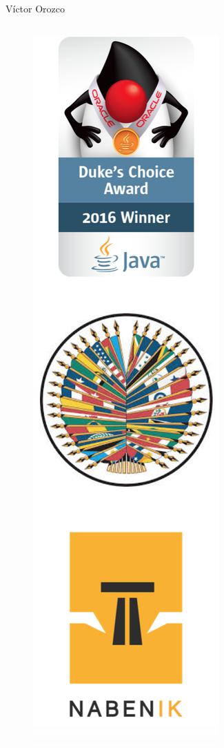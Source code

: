 \documentclass{beamer}
\begin{document}
\begin{frame}{Víctor Orozco}
\begin{columns}[T]
\begin{column}[T]{3cm}
\begin{figure}
                \includegraphics[width=0.6\linewidth]{Images/logos}
            \end{figure}
            
        \end{column}
    \end{columns}
\end{frame}
\end{document}
